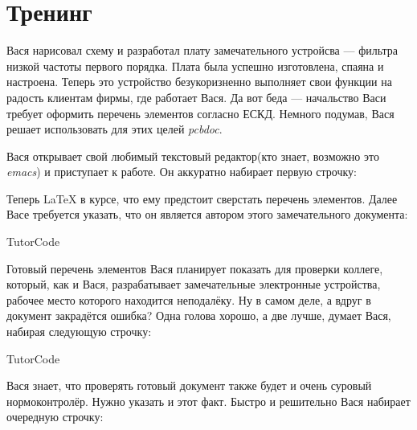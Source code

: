 
\section{Тренинг}

Вася нарисовал схему и разработал плату замечательного устройсва --- фильтра
низкой частоты первого порядка. Плата была успешно изготовлена, спаяна и
настроена. Теперь это устройство безукоризненно выполняет свои функции на радость
клиентам фирмы, где работает Вася. Да вот беда --- начальство Васи требует
оформить перечень элементов согласно ЕСКД. Немного подумав, Вася решает
использовать для этих целей \emph{pcbdoc}.

Вася открывает свой любимый текстовый редактор(кто знает, возможно это
\emph{emacs}) и приступает к работе. Он аккуратно набирает первую строчку:




Теперь \LaTeX{} в курсе, что ему предстоит сверстать перечень элементов.
Далее Васе требуется указать, что он является автором этого замечательного
документа:

\begin{SaveVerbatim}{TutorCode}
\end{SaveVerbatim}
\colorbox{codecolor}{}

Готовый перечень элементов Вася планирует показать для проверки коллеге, который,
как и Вася, разрабатывает замечательные электронные устройства, рабочее место
которого находится неподалёку. Ну в самом деле, а вдруг в документ закрадётся
ошибка? Одна голова хорошо, а две лучше, думает Вася, набирая следующую
строчку:

\begin{SaveVerbatim}{TutorCode}
\end{SaveVerbatim}
\colorbox{codecolor}{}

Вася знает, что проверять готовый документ также будет и очень суровый
нормоконтролёр. Нужно указать и этот факт. Быстро и решительно Вася набирает
очередную строчку:

